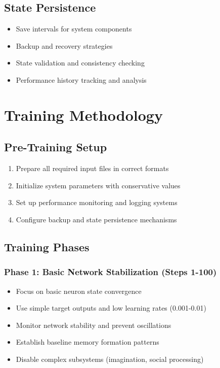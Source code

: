 \documentclass[11pt,a4paper]{article}
\begin{document}
\subsection{State Persistence}
\begin{itemize}[leftmargin=0.5in]
    \item Save intervals for system components
    \item Backup and recovery strategies
    \item State validation and consistency checking
    \item Performance history tracking and analysis
\end{itemize}

\section{Training Methodology}

\subsection{Pre-Training Setup}
\begin{enumerate}
    \item Prepare all required input files in correct formats
    \item Initialize system parameters with conservative values
    \item Set up performance monitoring and logging systems
    \item Configure backup and state persistence mechanisms
\end{enumerate}

\subsection{Training Phases}

\subsubsection{Phase 1: Basic Network Stabilization (Steps 1-100)}
\begin{itemize}[leftmargin=0.5in]
    \item Focus on basic neuron state convergence
    \item Use simple target outputs and low learning rates (0.001-0.01)
    \item Monitor network stability and prevent oscillations
    \item Establish baseline memory formation patterns
    \item Disable complex subsystems (imagination, social processing)
\end{itemize}
\end{document}
